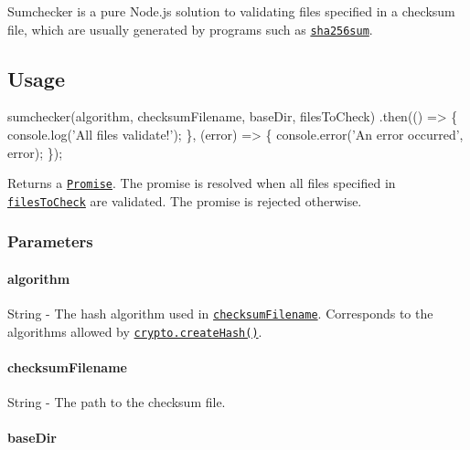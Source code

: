 \href{https://travis-ci.org/malept/sumchecker}{\tt } \href{https://ci.appveyor.com/project/malept/sumchecker}{\tt } \href{https://codeclimate.com/github/malept/sumchecker}{\tt } \href{https://codeclimate.com/github/malept/sumchecker/coverage}{\tt }

Sumchecker is a pure Node.\+js solution to validating files specified in a checksum file, which are usually generated by programs such as \href{https://en.wikipedia.org/wiki/Sha256sum}{\tt {\ttfamily sha256sum}}.

\subsection*{Usage}


\begin{DoxyCode}
sumchecker(algorithm, checksumFilename, baseDir, filesToCheck)
  .then(() => \{
    console.log('All files validate!');
  \}, (error) => \{
    console.error('An error occurred', error);
  \});
\end{DoxyCode}


Returns a \href{https://www.promisejs.org/}{\tt {\ttfamily Promise}}. The promise is resolved when all files specified in \href{#filesToCheck}{\tt {\ttfamily files\+To\+Check}} are validated. The promise is rejected otherwise.

\subsubsection*{Parameters}

\paragraph*{{\ttfamily algorithm}}

{\ttfamily String} -\/ The hash algorithm used in \href{#checksumFilename}{\tt {\ttfamily checksum\+Filename}}. Corresponds to the algorithms allowed by \href{https://nodejs.org/dist/latest-v4.x/docs/api/crypto.html#crypto_crypto_createhash_algorithm}{\tt {\ttfamily crypto.\+create\+Hash()}}.

\paragraph*{{\ttfamily checksum\+Filename}}

{\ttfamily String} -\/ The path to the checksum file.

\paragraph*{{\ttfamily base\+Dir}}

